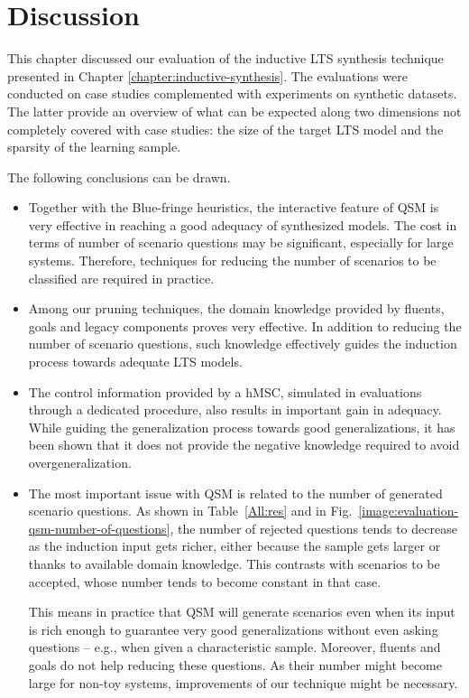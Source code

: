 \section{Discussion\label{section:evaluation-summary}}

This chapter discussed our evaluation of the inductive LTS synthesis technique presented in Chapter \ref{chapter:inductive-synthesis}. The evaluations were conducted on case studies complemented with experiments on synthetic datasets. The latter provide an overview of what can be expected along two dimensions not completely covered with case studies: the size of the target LTS model and the sparsity of the learning sample.  

The following conclusions can be drawn.
\begin{itemize}

\item Together with the Blue-fringe heuristics, the interactive feature of QSM is very effective in reaching a good adequacy of synthesized models. The cost in terms of number of scenario questions may be significant, especially for large systems. Therefore, techniques for reducing the number of scenarios to be classified are required in practice.

\item Among our pruning techniques, the domain knowledge provided by fluents, goals and legacy components proves very effective. In addition to reducing the number of scenario questions, such knowledge effectively guides the induction process towards adequate LTS models. 

\item The control information provided by a hMSC, simulated in evaluations through a dedicated procedure, also results in important gain in adequacy. While guiding the generalization process towards good generalizations, it has been shown that it does not provide the negative knowledge required to avoid overgeneralization.

\item The most important issue with QSM is related to the number of generated scenario questions. As shown in Table~\ref{All:res} and in Fig.~\ref{image:evaluation-qsm-number-of-questions}, the number of rejected questions tends to decrease as the induction input gets richer, either because the sample gets larger or thanks to available domain knowledge. This contrasts with scenarios to be accepted, whose number tends to become constant in that case.

This means in practice that QSM will generate scenarios even when its input is rich enough to guarantee very good generalizations without even asking questions -- e.g., when given a characteristic sample. Moreover, fluents and goals do not help reducing these questions. As their number might become large for non-toy systems, improvements of our technique might be necessary.


\end{itemize}
